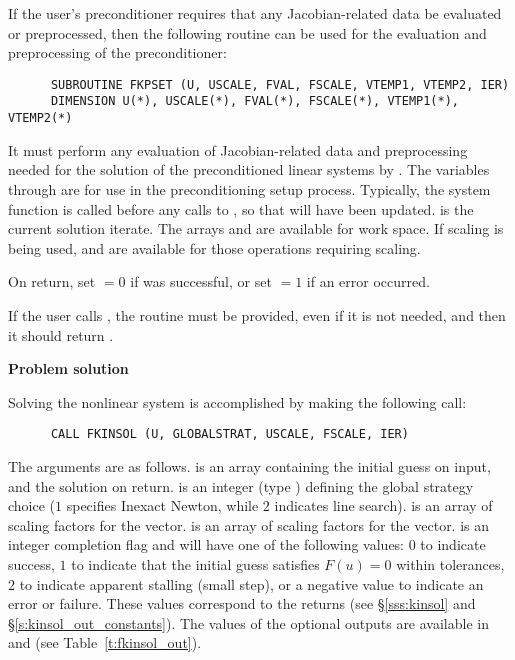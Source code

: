 \begin{Steps}
  If the user's preconditioner requires that any Jacobian-related data be evaluated
  or preprocessed, then the following routine can be used for the evaluation and
  preprocessing of the preconditioner:
\begin{verbatim}
      SUBROUTINE FKPSET (U, USCALE, FVAL, FSCALE, VTEMP1, VTEMP2, IER)
      DIMENSION U(*), USCALE(*), FVAL(*), FSCALE(*), VTEMP1(*), VTEMP2(*)
\end{verbatim}
  It must perform any evaluation of Jacobian-related data and
  preprocessing needed for the solution of the preconditioned linear
  systems by . The variables  through  are for use in the
  preconditioning setup process. Typically, the system function  is
  called before any calls to , so that  will have
  been updated.  is the current solution
  iterate. The arrays  and  are available for work space. 
  If scaling is being used,  and  are available for those operations
  requiring scaling.
  
  On return, set  $= 0$ if  was successful, or set  $= 1$
  if an error occurred.
  
  {\warn} If the user calls , the routine  must
  be provided, even if it is not needed, and then it should return .

\item {\bf Problem solution}

  Solving the nonlinear system is accomplished by making the following call:
\begin{verbatim}
      CALL FKINSOL (U, GLOBALSTRAT, USCALE, FSCALE, IER)
\end{verbatim}
  The arguments are as follows.
   is an array containing the initial guess on input, and the
  solution on return.
   is an integer (type ) defining the global strategy 
  choice ($1$ specifies Inexact Newton, while $2$ indicates line search).
   is an array of scaling factors for the  vector.
   is an array of scaling factors for the  vector.
   is an integer completion flag and will have one of the following values:
  $0$ to indicate success,
  $1$ to indicate that the initial guess satisfies $F(u) = 0$ within tolerances,
  $2$ to indicate apparent stalling (small step), or a negative value to indicate
  an error or failure. These values correspond to the  returns
  (see \S\ref{sss:kinsol} and \S\ref{s:kinsol_out_constants}). The values of
  the optional outputs are available in  and 
  (see Table~\ref{t:fkinsol_out}).


\end{Steps}
